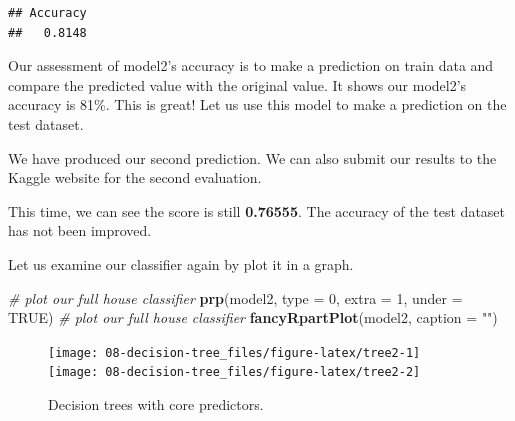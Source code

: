 \documentclass[
]{book}
\newenvironment{Shaded}{\begin{snugshade}}{\end{snugshade}}
\newcommand{\CommentTok}[1]{\textcolor[rgb]{0.56,0.35,0.01}{\textit{#1}}}
\newcommand{\DataTypeTok}[1]{\textcolor[rgb]{0.13,0.29,0.53}{#1}}
\newcommand{\DecValTok}[1]{\textcolor[rgb]{0.00,0.00,0.81}{#1}}
\newcommand{\KeywordTok}[1]{\textcolor[rgb]{0.13,0.29,0.53}{\textbf{#1}}}
\newcommand{\NormalTok}[1]{#1}
\newcommand{\OperatorTok}[1]{\textcolor[rgb]{0.81,0.36,0.00}{\textbf{#1}}}
\newcommand{\OtherTok}[1]{\textcolor[rgb]{0.56,0.35,0.01}{#1}}
\newcommand{\StringTok}[1]{\textcolor[rgb]{0.31,0.60,0.02}{#1}}
\begin{document}
\begin{verbatim}
## Accuracy 
##   0.8148
\end{verbatim}

Our assessment of model2's accuracy is to make a prediction on train data and compare the predicted value with the original value. It shows our model2's accuracy is 81\%. This is great! Let us use this model to make a prediction on the test dataset.

\begin{Shaded}
\end{Shaded}

We have produced our second prediction. We can also submit our results to the Kaggle website for the second evaluation.

This time, we can see the score is still \textbf{0.76555}. The accuracy of the test dataset has not been improved.

Let us examine our classifier again by plot it in a graph.

\begin{Shaded}
\begin{Highlighting}[]
\CommentTok{# plot our full house classifier }
\KeywordTok{prp}\NormalTok{(model2, }\DataTypeTok{type =} \DecValTok{0}\NormalTok{, }\DataTypeTok{extra =} \DecValTok{1}\NormalTok{, }\DataTypeTok{under =} \OtherTok{TRUE}\NormalTok{)}
\CommentTok{# plot our full house classifier }
\KeywordTok{fancyRpartPlot}\NormalTok{(model2, }\DataTypeTok{caption =} \StringTok{""}\NormalTok{)}
\end{Highlighting}
\end{Shaded}

\begin{figure}

{\centering \texttt{[image: 08-decision-tree\_files/figure-latex/tree2-1]} \texttt{[image: 08-decision-tree\_files/figure-latex/tree2-2]} 

}

\caption{Decision trees with core predictors.}\label{fig:tree2}
\end{figure}
\end{document}
